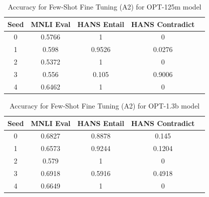 \documentclass[10pt,twocolumn,letterpaper]{article}
\begin{document}
	
				
				
	
	\begin{table}[h!]
	\begin{center}
	\begin{tabular}{|c|c|c|c|c|}
	\hline
	\textbf{Seed} & \textbf{MNLI Eval} & \textbf{HANS Entail} & \textbf{HANS Contradict} \\
	\hline
	\hline
	0 & 0.5766 & 1 & 0 \\
	1 & 0.598 & 0.9526 & 0.0276 \\
	2 & 0.5372 & 1 & 0 \\
	3 & 0.556 & 0.105 & 0.9006 \\
	4 & 0.6462 & 1 & 0 \\
	\hline
	\end{tabular}
	\end{center}
	\caption{Accuracy for Few-Shot Fine Tuning (A2) for OPT-125m model}
	\end{table}
	
	\begin{table}[h!]
	\begin{center}
	\begin{tabular}{|c|c|c|c|c|}
	\hline
	\textbf{Seed} & \textbf{MNLI Eval} & \textbf{HANS Entail} & \textbf{HANS Contradict} \\
	\hline
	\hline
	0 & 0.6827 & 0.8878 & 0.145 \\
	1 & 0.6573 & 0.9244 & 0.1204 \\
	2 & 0.579 & 1 & 0 \\
	3 & 0.6918 & 0.5916 & 0.4918 \\
	4 & 0.6649 & 1 & 0 \\
	\hline
	\end{tabular}
	\end{center}
	\caption{Accuracy for Few-Shot Fine Tuning (A2) for OPT-1.3b model}
	\end{table}
	
				
				
				
				
				
\end{document}
